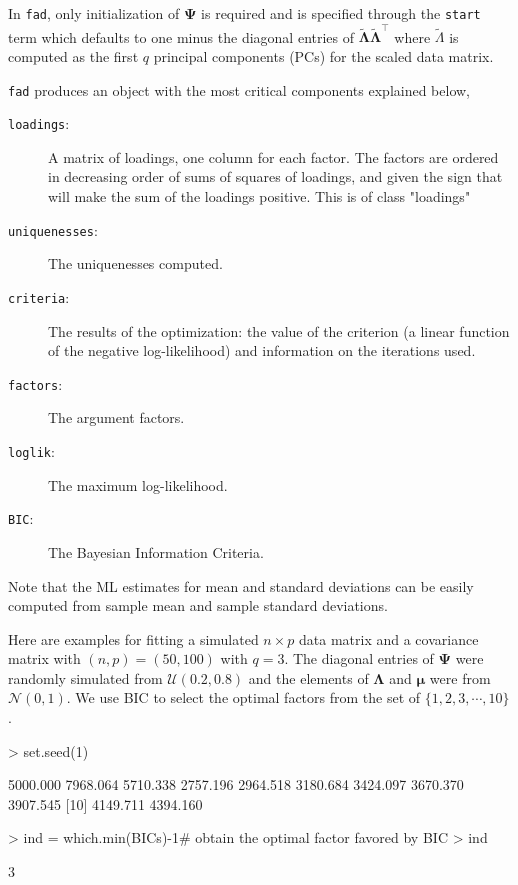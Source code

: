 \documentclass{article}
\begin{document}
In \texttt{fad}, only initialization of $\bm{\Psi}$ is required and is specified through the \texttt{start} term which defaults to one minus the diagonal entries of $\bm{\tilde\Lambda}\bm{\tilde\Lambda}^{\top}$ where $\tilde\Lambda$ is computed as the first $q$ principal components (PCs) for the scaled data matrix. 

\texttt{fad} produces an object with the most critical components explained below,
\begin{description}
\item[\texttt{loadings}:] A matrix of loadings, one column for each factor. The factors are ordered in decreasing order of sums of squares of loadings, and given the sign that will make the sum of the loadings positive. This is of class "loadings"
\item[\texttt{uniquenesses}:]	The uniquenesses computed.
\item[\texttt{criteria}:]	The results of the optimization: the value of the criterion (a linear function of the negative log-likelihood) and information on the iterations used.
\item[\texttt{factors}:] The argument factors.
\item[\texttt{loglik}:] The maximum log-likelihood.
\item[\texttt{BIC}:] The Bayesian Information Criteria.
\end{description}
Note that the ML estimates for mean and standard deviations can be easily computed from sample mean and sample standard deviations.

Here are examples for fitting a simulated $n\times p$ data matrix and a covariance matrix with $(n,p) = (50,100)$ with $q=3$. The diagonal entries of $\bm{\Psi}$ were randomly simulated from $\mathcal{U}(0.2,0.8)$ and the elements of $\bm{\Lambda}$ and $\bm{\mu}$ were from $\mathcal{N}(0,1)$. We use BIC to select the optimal factors from the set of $\{1,2,3,\cdots,10\}$.
\begin{Schunk}
\begin{Sinput}
> set.seed(1)
\end{Sinput}
\end{Schunk}
\begin{Schunk}
\begin{Soutput}
 [1] 5000.000 7968.064 5710.338 2757.196 2964.518 3180.684 3424.097 3670.370 3907.545
[10] 4149.711 4394.160
\end{Soutput}
\begin{Sinput}
> ind = which.min(BICs)-1# obtain the optimal factor favored by BIC
> ind
\end{Sinput}
\begin{Soutput}
[1] 3
\end{Soutput}
\end{Schunk}
\end{document}
